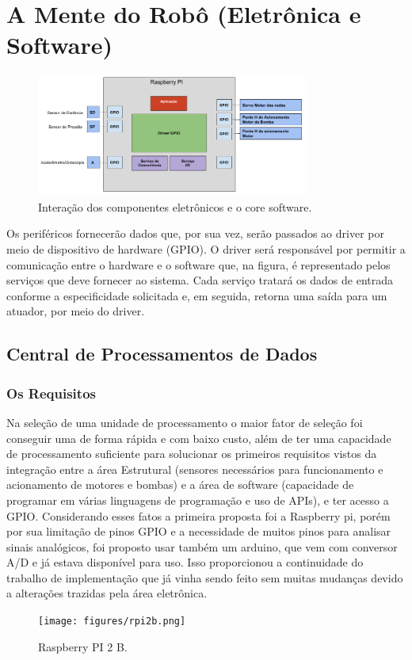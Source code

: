 \section{A Mente do Robô (Eletrônica e Software)}
\par
\begin{figure}[h]
  \centering
  \includegraphics[width=0.8\textwidth]{figures/schema-eletro-soft.png}
  \caption{Interação dos componentes eletrônicos e o core software.}
  \label{fig:schema-eletro-soft}
\end{figure}
\FloatBarrier
\par
Os periféricos fornecerão dados que, por sua vez, serão passados ao driver por meio de dispositivo de hardware (GPIO).  O driver será responsável por permitir a comunicação entre o hardware e o software que, na figura, é representado pelos serviços que deve fornecer ao sistema. Cada serviço tratará os dados de entrada conforme a especificidade solicitada e, em seguida, retorna uma saída para um atuador, por meio do driver.

\subsection{Central de Processamentos de Dados}
\subsubsection{Os Requisitos}
Na seleção de uma unidade de processamento o maior fator de seleção foi conseguir uma de forma rápida e com baixo custo, além de ter uma capacidade de processamento suficiente para solucionar os primeiros requisitos vistos da integração entre a área Estrutural (sensores necessários para funcionamento e acionamento de motores e bombas) e a área de software (capacidade de programar em várias linguagens de programação e uso de APIs), e ter acesso a GPIO. Considerando esses fatos a primeira proposta foi a Raspberry pi, porém por sua limitação de pinos GPIO e a necessidade de muitos pinos para analisar sinais analógicos, foi proposto usar também um arduino, que vem com conversor A/D e já estava disponível para uso. Isso proporcionou a continuidade do trabalho de implementação que já vinha sendo feito sem muitas mudanças devido a alterações trazidas pela área eletrônica.
\par
\begin{figure}[h]
  \centering
  \texttt{[image: figures/rpi2b.png]}
  \caption{Raspberry PI 2 B.}
  \label{fig:schema-eletro-soft}
\end{figure}
\FloatBarrier
\par
